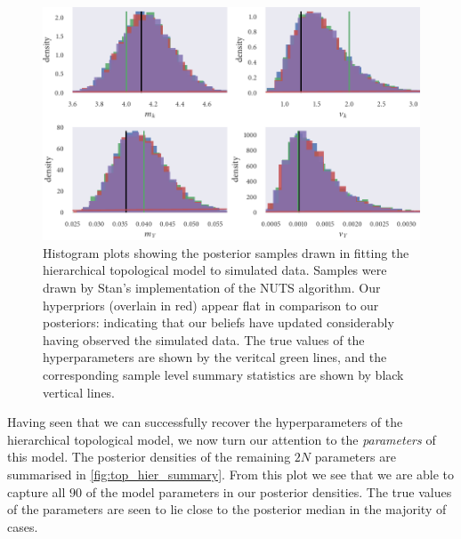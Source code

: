 \begin{figure}[tbp]
  \includegraphics{top_hier_hist.pdf}
  \caption{Histogram plots showing the posterior samples drawn in fitting the
    hierarchical topological model to simulated data. Samples were drawn by
    Stan's implementation of the NUTS algorithm. Our hyperpriors (overlain in
    red) appear flat in comparison to our posteriors: indicating that
    our beliefs have updated considerably having observed the simulated data.
    The true values of the hyperparameters are shown by the veritcal green
    lines, and the corresponding sample level summary statistics are shown by black
    vertical lines.}
  \label{fig:top_hier_hist}
\end{figure}

Having seen that we can successfully recover the hyperparameters of the
hierarchical topological model, we now turn our attention to the
\emph{parameters} of this model. The posterior densities of the remaining $2N$
parameters are summarised in \cref{fig:top_hier_summary}. From this plot we see
that we are able to capture all $90$ of the model parameters in our posterior
densities. The true values of the parameters are seen to lie close to the
posterior median in the majority of cases.

